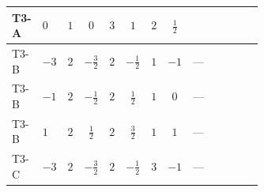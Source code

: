 \documentclass[8pt]{article}
\begin{document}
\begin{landscape}
\begin{longtable}{@{}llcccccc >{\raggedright\arraybackslash}p{0.21\linewidth} >{\raggedright\arraybackslash}p{0.21\linewidth} >{\raggedright\arraybackslash}p{0.21\linewidth}@{}}
\midrule
T3-A & $0$ & $1$ & $0$ & $3$ & $1$ & $2$ & $\frac{1}{2}$ & \scriptsize\adjustbox{max width=\linewidth}{$\begin{gathered} -\frac{15 {g_1}^2 {\lambda_{HS_2}^{(1)}}}{2}\end{gathered}$} & \scriptsize\adjustbox{max width=\linewidth}{$\begin{gathered} +2 {\lambda_{12}^{(1)}} {\lambda_{HS_1}^{(1)}}\end{gathered}$} & \scriptsize\adjustbox{max width=\linewidth}{$\begin{gathered} +6 {\lambda_1} {\lambda_{HS_2}^{(1)}}\end{gathered}$} \\
\midrule
T3-B & $-3$ & $2$ & $-\frac{3}{2}$ & $2$ & $-\frac{1}{2}$ & $1$ & $-1$ & --- & \scriptsize\adjustbox{max width=\linewidth}{$\begin{gathered} +4 {\lambda_{12}^{(1)}} {\lambda_{HS_1}^{(1)}}\end{gathered}$} & \scriptsize\adjustbox{max width=\linewidth}{$\begin{gathered} +6 {\lambda_1} {\lambda_{HS_2}^{(1)}}\end{gathered}$} \\
\midrule
T3-B & $-1$ & $2$ & $-\frac{1}{2}$ & $2$ & $\frac{1}{2}$ & $1$ & $0$ & --- & \scriptsize\adjustbox{max width=\linewidth}{$\begin{gathered} +4 {\lambda_{12}^{(1)}} {\lambda_{HS_1}^{(1)}}\end{gathered}$} & \scriptsize\adjustbox{max width=\linewidth}{$\begin{gathered} +6 {\lambda_1} {\lambda_{HS_2}^{(1)}}\end{gathered}$} \\
\midrule
T3-B & $1$ & $2$ & $\frac{1}{2}$ & $2$ & $\frac{3}{2}$ & $1$ & $1$ & --- & \scriptsize\adjustbox{max width=\linewidth}{$\begin{gathered} +4 {\lambda_{12}^{(1)}} {\lambda_{HS_1}^{(1)}}\end{gathered}$} & \scriptsize\adjustbox{max width=\linewidth}{$\begin{gathered} +6 {\lambda_1} {\lambda_{HS_2}^{(1)}}\end{gathered}$} \\
\midrule
T3-C & $-3$ & $2$ & $-\frac{3}{2}$ & $2$ & $-\frac{1}{2}$ & $3$ & $-1$ & --- & \scriptsize\adjustbox{max width=\linewidth}{$\begin{gathered} +4 {\lambda_{12}^{(1)}} {\lambda_{HS_1}^{(1)}}\end{gathered}$} & \scriptsize\adjustbox{max width=\linewidth}{$\begin{gathered} +6 {\lambda_1} {\lambda_{HS_2}^{(1)}}\end{gathered}$} \\

\end{longtable}
\end{landscape}
\end{document}
